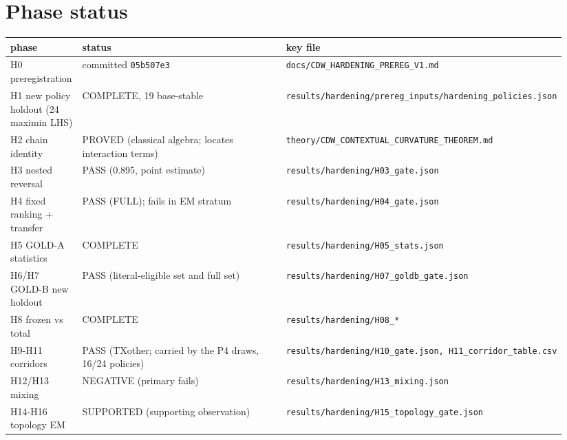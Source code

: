 \documentclass[10pt,a4paper]{article}
\begin{document}
\section{Phase status}
{\small
\begin{longtable}{L{0.130\linewidth}L{0.482\linewidth}L{0.328\linewidth}}
\toprule
\textbf{phase} & \textbf{status} & \textbf{key file} \\
\midrule
\endhead
H0 preregistration & committed \texttt{05b507e3} & \texttt{docs/\allowbreak{}CDW\_\allowbreak{}HARDENING\_\allowbreak{}PREREG\_\allowbreak{}V1.md} \\
H1 new policy holdout (24 maximin LHS) & COMPLETE, 19 base-stable & \texttt{results/\allowbreak{}hardening/\allowbreak{}prereg\_\allowbreak{}inputs/\allowbreak{}hardening\_\allowbreak{}policies.json} \\
H2 chain identity & PROVED (classical algebra; locates interaction terms) & \texttt{theory/\allowbreak{}CDW\_\allowbreak{}CONTEXTUAL\_\allowbreak{}CURVATURE\_\allowbreak{}THEOREM.md} \\
H3 nested reversal & PASS (0.895, point estimate) & \texttt{results/\allowbreak{}hardening/\allowbreak{}H03\_\allowbreak{}gate.json} \\
H4 fixed ranking + transfer & PASS (FULL); fails in EM stratum & \texttt{results/\allowbreak{}hardening/\allowbreak{}H04\_\allowbreak{}gate.json} \\
H5 GOLD-A statistics & COMPLETE & \texttt{results/\allowbreak{}hardening/\allowbreak{}H05\_\allowbreak{}stats.json} \\
H6/H7 GOLD-B new holdout & PASS (literal-eligible set and full set) & \texttt{results/\allowbreak{}hardening/\allowbreak{}H07\_\allowbreak{}goldb\_\allowbreak{}gate.json} \\
H8 frozen vs total & COMPLETE & \texttt{results/\allowbreak{}hardening/\allowbreak{}H08\_\allowbreak{}*} \\
H9-H11 corridors & PASS (TXother; carried by the P4 draws, 16/24 policies) & \texttt{results/\allowbreak{}hardening/\allowbreak{}H10\_\allowbreak{}gate.json, H11\_\allowbreak{}corridor\_\allowbreak{}table.csv} \\
H12/H13 mixing & NEGATIVE (primary fails) & \texttt{results/\allowbreak{}hardening/\allowbreak{}H13\_\allowbreak{}mixing.json} \\
H14-H16 topology EM & SUPPORTED (supporting observation) & \texttt{results/\allowbreak{}hardening/\allowbreak{}H15\_\allowbreak{}topology\_\allowbreak{}gate.json} \\

\end{longtable}}
\end{document}
